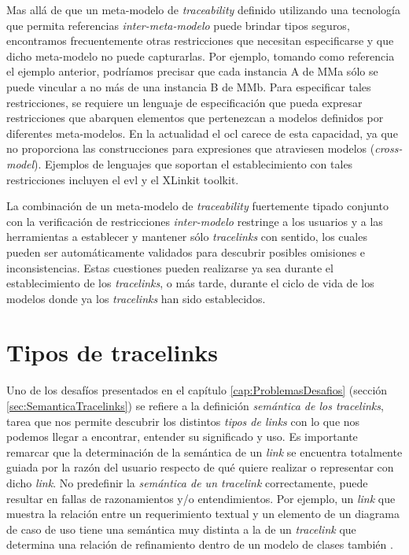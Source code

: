 \documentclass[a4paper,12pt,oneside,spanish]{book}
\begin{document}
Mas allá de que un meta-modelo de \textit{traceability} definido utilizando una tecnología que permita referencias \textit{inter-meta-modelo} puede brindar tipos seguros, encontramos frecuentemente otras restricciones que necesitan especificarse y que dicho meta-modelo no puede capturarlas. Por ejemplo, tomando como referencia el ejemplo anterior, podríamos precisar que cada instancia A de MMa sólo se puede vincular a no más de una instancia B de MMb. Para especificar tales restricciones, se requiere un lenguaje de especificación que pueda expresar restricciones que abarquen elementos que pertenezcan a modelos definidos por diferentes meta-modelos. En la actualidad el \gls{ocl} carece de esta capacidad, ya que no proporciona las construcciones para expresiones que atraviesen modelos (\textit{cross-model}). Ejemplos de lenguajes que soportan el establecimiento con tales restricciones incluyen el \gls{evl} y el XLinkit toolkit.

La combinación de un meta-modelo de \textit{traceability} fuertemente tipado conjunto con la verificación de restricciones \textit{inter-modelo} restringe a los usuarios y a las herramientas a establecer y mantener sólo \textit{tracelinks} con sentido, los cuales pueden ser automáticamente validados para descubrir posibles omisiones e inconsistencias. Estas cuestiones pueden realizarse ya sea durante el establecimiento de los \textit{tracelinks}, o más tarde, durante el ciclo de vida de los modelos donde ya los \textit{tracelinks} han sido establecidos.




\section{Tipos de tracelinks}

Uno de los desafíos presentados en el capítulo \ref{cap:ProblemasDesafios} (sección \ref{sec:SemanticaTracelinks}) se refiere a la definición  \textit{semántica de los tracelinks}, tarea que nos permite descubrir los distintos \textit{tipos de links} con lo que nos podemos llegar a encontrar, entender su significado y uso. Es importante remarcar que la determinación de la semántica de un \textit{link} se encuentra totalmente guiada por la razón del usuario respecto de qué quiere realizar o representar con dicho \textit{link}. No predefinir la \textit{semántica de un tracelink} correctamente, puede resultar en fallas de razonamientos y/o entendimientos. Por ejemplo, un \textit{link} que muestra la relación entre un requerimiento textual y un elemento de un diagrama de caso de uso  tiene una semántica muy distinta a la de un \textit{tracelink} que determina una relación de refinamiento dentro de un modelo de clases también .
\end{document}
